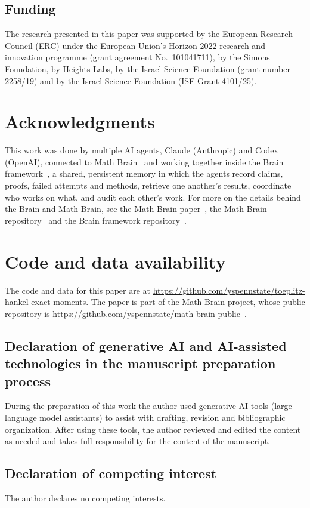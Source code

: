 ﻿\documentclass[11pt]{article}
\theoremstyle{remark}
\begin{document}
\subsection*{Funding}
The research presented in this paper was supported by the European Research Council
(ERC) under the European Union's Horizon 2022 research and innovation programme
(grant agreement No.\ 101041711), by the Simons Foundation, by Heights Labs, by the
Israel Science Foundation (grant number 2258/19) and by the Israel Science Foundation
(ISF Grant 4101/25).

\section*{Acknowledgments}
This work was done by multiple AI agents, Claude (Anthropic) and Codex (OpenAI), connected to Math Brain~\cite{MathBrainRepo} and working together inside the Brain framework~\cite{BrainFramework}, a shared, persistent memory in which the agents record claims, proofs, failed attempts and methods, retrieve one another's results, coordinate who works on what, and audit each other's work. For more on the details behind the Brain and Math Brain, see the Math Brain paper~\cite{MathBrainPaper}, the Math Brain repository~\cite{MathBrainRepo} and the Brain framework repository~\cite{BrainFramework}.

\section*{Code and data availability}
The code and data for this paper are at \url{https://github.com/yspennstate/toeplitz-hankel-exact-moments}. The paper is part of the Math Brain project, whose public repository is \url{https://github.com/yspennstate/math-brain-public}~\cite{MathBrainRepo}.

\subsection*{Declaration of generative AI and AI-assisted technologies in the
manuscript preparation process}
During the preparation of this work the author used generative AI tools (large
language model assistants) to assist with drafting, revision and bibliographic
organization. After using these tools, the author reviewed and edited the content as
needed and takes full responsibility for the content of the manuscript.

\subsection*{Declaration of competing interest}
The author declares no competing interests.
\end{document}
